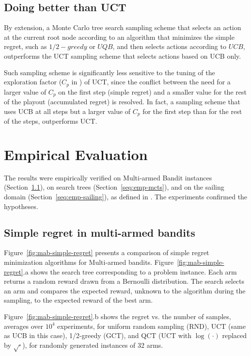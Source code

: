 \documentclass{article}
\begin{document}
\subsection{Doing better than UCT}

By extension, a Monte Carlo tree search sampling scheme that selects
an action at the current root node according to an algorithm that
minimizes the simple regret, such as $1/2-greedy$ or $UQB$, and then
selects actions according to $UCB$, outperforms the UCT sampling
scheme that selects actions based on UCB only.

Such sampling scheme is significantly less sensitive to the tuning of
the exploration factor ($C_p$ in \cite{Kocsis.uct}) of UCT, since
the conflict \cite{Bubeck.pure} between the need for a larger value of $C_p$ on the first
step (simple regret) and a smaller value for the rest of the playout
(accumulated regret) is resolved. In fact, a sampling scheme that uses
UCB at all steps but a larger value of $C_p$ for the first step than
for the rest of the steps, outperforms UCT.

\section{Empirical Evaluation}

The results were empirically verified on Multi-armed Bandit instances
(Section~\ref{seq:emp-mab}), on search trees
(Section~\ref{seq:emp-mcts}), and on the sailing domain
(Section~\ref{seq:emp-sailing}), as defined in \cite{Kocsis.uct}. The
experiments confirmed the hypotheses.

\subsection{Simple regret in multi-armed bandits}
\label{seq:emp-mab}

Figure~\ref{fig:mab-simple-regret} presents a comparison of simple
regret minimization algorithms for Multi-armed
bandits. Figure~\ref{fig:mab-simple-regret}.a shows the search tree
corresponding to a problem instance. Each arm returns a random reward
drawn from a Bernoulli distribution. The search selects an arm
and compares the expected reward, unknown to the algorithm during the
sampling, to the expected reward of the best arm.

Figure~\ref{fig:mab-simple-regret}.b shows the regret
vs. the number of samples, averages over $10^4$ experiments, for uniform
random sampling (RND), UCT (same as UCB in this case),
1/2-greedy (GCT), and QCT (UCT with $\log(\cdot)$ replaced by
$\sqrt{\cdot}$), for randomly generated instances of 32 arms. 
\end{document}

